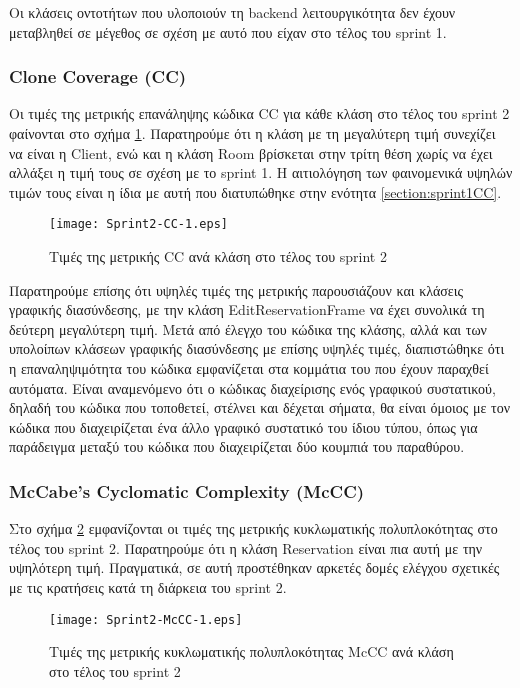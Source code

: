 Οι κλάσεις οντοτήτων που υλοποιούν τη backend λειτουργικότητα δεν έχουν
μεταβληθεί σε μέγεθος σε σχέση με αυτό που είχαν στο τέλος του sprint 1.

\subsubsection{Clone Coverage (CC)}
\label{section:sprint2CC}

Οι τιμές της μετρικής επανάληψης κώδικα CC για κάθε κλάση στο τέλος του
sprint 2 φαίνονται στο σχήμα \ref{fig:sprint2CC}. Παρατηρούμε ότι η
κλάση με τη μεγαλύτερη τιμή συνεχίζει να είναι η Client, ενώ και η κλάση
Room βρίσκεται στην τρίτη θέση χωρίς να έχει
αλλάξει η τιμή τους σε σχέση με το sprint 1. Η αιτιολόγηση των
φαινομενικά υψηλών τιμών τους είναι η ίδια με αυτή που διατυπώθηκε στην
ενότητα \ref{section:sprint1CC}.

\begin{figure}
\centering
\texttt{[image: Sprint2-CC-1.eps]}
\caption{Τιμές της μετρικής CC ανά κλάση στο τέλος του sprint 2}
\label{fig:sprint2CC}
\end{figure}

Παρατηρούμε επίσης ότι υψηλές τιμές της μετρικής παρουσιάζουν και
κλάσεις γραφικής διασύνδεσης, με την κλάση EditReservationFrame να έχει
συνολικά τη δεύτερη μεγαλύτερη τιμή. Μετά από έλεγχο του κώδικα της
κλάσης, αλλά και των υπολοίπων κλάσεων γραφικής διασύνδεσης με επίσης
υψηλές τιμές, διαπιστώθηκε ότι η επαναληψιμότητα του κώδικα εμφανίζεται
στα κομμάτια του που έχουν παραχθεί αυτόματα. Είναι αναμενόμενο ότι ο
κώδικας διαχείρισης ενός γραφικού συστατικού, δηλαδή του κώδικα που
τοποθετεί, στέλνει και δέχεται σήματα, θα είναι όμοιος με τον
κώδικα που διαχειρίζεται ένα άλλο γραφικό συστατικό του ίδιου τύπου,
όπως για παράδειγμα μεταξύ του κώδικα που διαχειρίζεται δύο κουμπιά του
παραθύρου.

\subsubsection{McCabe's Cyclomatic Complexity (McCC)}
\label{section:sprint2McCC}

Στο σχήμα \ref{fig:sprint2McCC} εμφανίζονται οι τιμές της μετρικής
κυκλωματικής πολυπλοκότητας στο τέλος του sprint 2. Παρατηρούμε ότι η
κλάση Reservation είναι πια αυτή με την υψηλότερη τιμή. Πραγματικά, σε
αυτή προστέθηκαν αρκετές δομές ελέγχου σχετικές με τις κρατήσεις κατά τη
διάρκεια του sprint 2.

\begin{figure}
\centering
\texttt{[image: Sprint2-McCC-1.eps]}
\caption{Τιμές της μετρικής κυκλωματικής πολυπλοκότητας McCC ανά κλάση στο τέλος του sprint 2}
\label{fig:sprint2McCC}
\end{figure}

